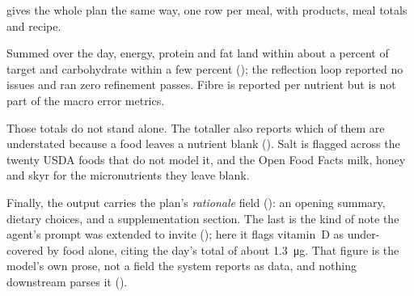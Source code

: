  gives the whole plan the same way, one row per meal, with products, meal totals and recipe.

\begin{table}[htbp]
    \centering
    \scriptsize
    \setlength{\tabcolsep}{4pt}
    \renewcommand{\arraystretch}{1.15}
    
    \caption[Full-day meal plan (trimmed).]{The full meal plan: one row per meal, with products, energy and macronutrient totals, and recipe. Product lists and recipes are trimmed (\texttt{[\ldots]}).}
    \label{tab:example-mealplan}
\end{table}

Summed over the day, energy, protein and fat land within about a percent of target and carbohydrate within a few percent (); the reflection loop reported no issues and ran zero refinement passes. Fibre is reported per nutrient but is not part of the macro error metrics.

\begin{table}[htbp]
    \centering
    \footnotesize
    
    \caption[Day totals vs targets.]{The day's nutrient totals against the run's macro targets. A dash marks an untargeted nutrient. Meal-level carbohydrate figures in  sum to \qty{397.4}{\gram}; the day total here is \qty{397.5}{\gram} because each figure is rounded independently. Salt is a coverage-incomplete field, not a conversion of the sodium total; see .}
    \label{tab:example-totals}
\end{table}

Those totals do not stand alone. The totaller also reports which of them are understated because a food leaves a nutrient blank (). Salt is flagged across the twenty USDA foods that do not model it, and the Open Food Facts milk, honey and skyr for the micronutrients they leave blank.

\begin{table}[htbp]
    \centering
    \footnotesize
    
    \caption[Nutrient coverage caveats.]{Data-coverage caveats: per nutrient, the number of plan foods with no value, their share of plan mass, and the understated total.}
    \label{tab:example-caveats}
\end{table}

Finally, the output carries the plan's \emph{rationale} field (): an opening summary, dietary choices, and a supplementation section. The last is the kind of note the agent's prompt was extended to invite (); here it flags vitamin~D as under-covered by food alone, citing the day's total of about \qty{1.3}{\micro\gram}. That figure is the model's own prose, not a field the system reports as data, and nothing downstream parses it ().

